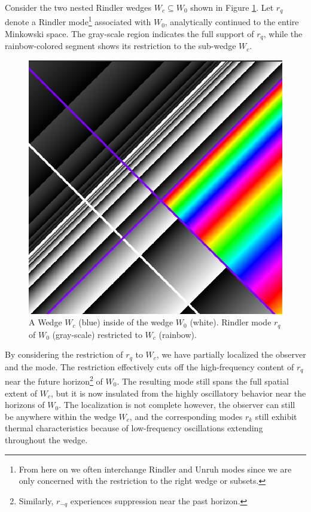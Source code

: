 \documentclass[12pt,a4paper]{article}
\begin{document}
Consider the two nested Rindler wedges $W_c \subseteq W_0$ shown in Figure \ref{restrict}. Let $r_q$ denote a Rindler mode\footnote{From here on we often interchange Rindler and Unruh modes since we are only concerned with the restriction to the right wedge or subsets.} associated with $W_0$, analytically continued to the entire Minkowski space. The gray-scale region indicates the full support of $r_q$, while the rainbow-colored segment shows its restriction to the sub-wedge $W_c$.

\begin{figure}[h]
  \centering
\includegraphics[scale=0.4]{wedge_in_wedge.png}
\caption{A Wedge $W_c$ (blue) inside of the wedge $W_0$ (white). Rindler mode $r_q$ of $W_0$ (gray-scale) restricted to $W_c$ (rainbow).}
\label{restrict}
\end{figure}

By considering the restriction of $r_q$ to $W_c$, we have partially localized the observer and the mode. The restriction effectively cuts off the high-frequency content of $r_q$ near the future horizon\footnote{Similarly, $r_{-q}$ experiences suppression near the past horizon.} of $W_0$. The resulting mode still spans the full spatial extent of $W_c$, but it is now insulated from the highly oscillatory behavior near the horizons of $W_0$.  The localization is not complete however, the observer can still be anywhere within the wedge $W_c$, and the corresponding modes $r_k$ still exhibit thermal characteristics because of low-frequency oscillations extending throughout the wedge.
\end{document}

